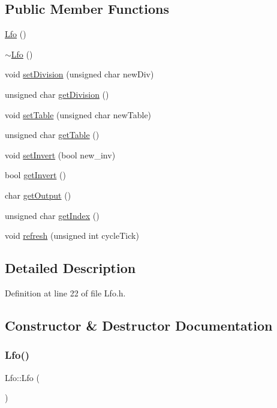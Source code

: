 \subsection*{Public Member Functions}
\begin{DoxyCompactItemize}
\item 
\hyperlink{class_lfo_aa1546b11ce8b14895de9200209006332}{Lfo} ()
\item 
\hyperlink{class_lfo_a95e36a9f84091073c742983741247367}{$\sim$\+Lfo} ()
\item 
void \hyperlink{class_lfo_a525733f0ed750902b8577b08c0c55023}{set\+Division} (unsigned char new\+Div)
\item 
unsigned char \hyperlink{class_lfo_afba7d39f952c4b02d101f8e46e9cc20d}{get\+Division} ()
\item 
void \hyperlink{class_lfo_a6c0c12b49e8b69c4e839eed57130d2ad}{set\+Table} (unsigned char new\+Table)
\item 
unsigned char \hyperlink{class_lfo_a9f017ebd3b628e4afbca7371cdebc61c}{get\+Table} ()
\item 
void \hyperlink{class_lfo_ae4f5f170252aabf8d6e44556e587779e}{set\+Invert} (bool new\+\_\+inv)
\item 
bool \hyperlink{class_lfo_af55fdb8ee75c2da369056a1b0720fe41}{get\+Invert} ()
\item 
char \hyperlink{class_lfo_a0363f6a07cb699caf291b4954a40f152}{get\+Output} ()
\item 
unsigned char \hyperlink{class_lfo_a007a56fbcb5a5cf639dc397d35d6392f}{get\+Index} ()
\item 
void \hyperlink{class_lfo_a42c8d118df4ecbf3057319b56203133d}{refresh} (unsigned int cycle\+Tick)
\end{DoxyCompactItemize}


\subsection{Detailed Description}


Definition at line 22 of file Lfo.\+h.



\subsection{Constructor \& Destructor Documentation}
\mbox{\label{class_lfo_aa1546b11ce8b14895de9200209006332}} 
\subsubsection{\texorpdfstring{Lfo()}{Lfo()}}
{\footnotesize\ttfamily Lfo\+::\+Lfo (\begin{DoxyParamCaption}{ }\end{DoxyParamCaption})}



